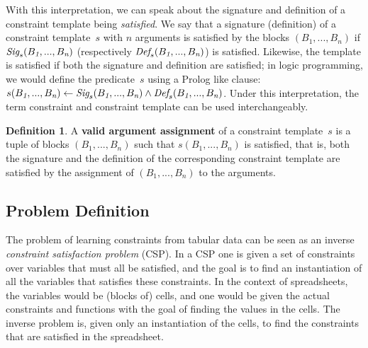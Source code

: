 \documentclass{IEEEtran}
\newcommand{\range}[3]{\ensuremath{#1[#2,#3]}}
\newcommand{\rangeall}{:}
\newcommand{\eccalc}[2]{\ensuremath{#1 = #2}}
\newcommand{\ecrank}[2]{\eccalc{#1}{\textit{RANK}(#2)}}
\newcommand{\sbs}{B}
\newcommand{\sbl}[1]{\ensuremath{\sbs_{\textit{#1}}}}
\theoremstyle{definition}
\newtheorem{definition}{Definition}
\begin{document}

With this interpretation, we can speak about the signature and definition of a constraint template being \textit{satisfied}.
We say that a signature (definition) of a constraint template~$s$ with $n$ arguments is satisfied by the blocks $(\sbl{1}, ..., \sbl{n})$ if $\sigc(\sbl{1}, ..., \sbl{n})$ (respectively $\defc(\sbl{1}, ..., \sbl{n})$) is satisfied.
Likewise, the template is satisfied if both the signature and definition are satisfied; in logic programming, we would define the predicate~$s$ using a Prolog like clause: $s(\sbl{1}, ..., \sbl{n}) \leftarrow \sigc(\sbl{1}, ..., \sbl{n}) \wedge \defc(\sbl{1}, ..., \sbl{n})$.
Under this interpretation, the term constraint and constraint template can be used interchangeably.

\begin{definition}
A \textbf{valid argument assignment} of a constraint template~$s$ is a tuple of blocks $(\sbl{1}, ..., \sbl{n})$ such that $s(\sbl{1}, ..., \sbl{n})$ is satisfied, that is, both the signature and the definition of the corresponding constraint template are satisfied by the assignment of $(\sbl{1}, ..., \sbl{n})$ to the arguments.
\end{definition}





\subsection{Problem Definition}\label{sec:problem_statement}
The problem of learning constraints from tabular data can be seen as an inverse {\em constraint satisfaction problem} (CSP).
In a CSP one is given a set of constraints over variables that must all be satisfied, and the goal is to find an instantiation of all the variables that satisfies these constraints.
In the context of spreadsheets, the variables would be (blocks of) cells, and one would be given the actual constraints and functions with the goal of finding the values in the cells.
The inverse problem is, given only an instantiation of the cells, to find the constraints that are satisfied in the spreadsheet.
\end{document}
